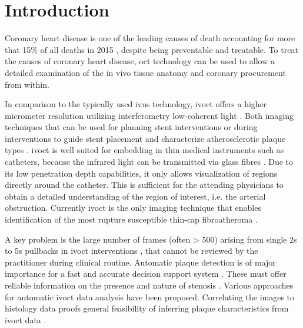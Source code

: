 \chapter{Introduction}

Coronary heart disease is one of the leading causes of death \cite{HannahRitchie.2018, NationalVitalStatisticsReports.2017} accounting for more that 15\% of all deaths in 2015 \cite{Kolluru.2018}, despite being preventable and treatable. To treat the causes of coronary heart disease, \acrfull{oct} technology can be used to allow a detailed examination of the in vivo tissue anatomy and coronary procurement from within.

In comparison to the typically used \acrfull{ivus} technology, \acrfull{ivoct} offers a higher micrometer resolution utilizing interferometry low-coherent light \cite{Schippling.2015, Drexler.2008}. Both imaging techniques that can be used for planning stent interventions or during interventions to guide stent placement and characterize atherosclerotic plaque types \cite{Kolluru.2018}. \Acrshort{ivoct} is well suited for embedding in thin medical instruments such as catheters, because the infrared light can be transmitted via glass fibres \cite{HiramG.Bezerra.2009, Gessert.2019}. Due to its low penetration depth capabilities, it only allows visualization of regions directly around the catheter. This is sufficient for the attending physicians to obtain a detailed understanding of the region of interest, i.e. the arterial obstruction. \cite{Gessert.2019} Currently \acrshort{ivoct} is the only imaging technique that enables identification of the most rupture susceptible thin-cap fibroatheroma \cite{GuhaRoy.2016}.

A key problem is the large number of frames (often > 500) arising from single 2s to 5s pullbacks in \acrshort{ivoct} interventions \cite{Kolluru.2018}, that cannot be reviewed by the practitioner during clinical routine. Automatic plaque detection is of major importance for a fast and accurate decision support system \cite{Gessert.2019}. These must offer reliable information on the presence and nature of stenosis \cite{Gessert.2019}. Various approaches for automatic \acrshort{ivoct} data analysis have been proposed. Correlating the images to histology data proofs general feasibility of inferring plaque characteristics from \acrshort{ivoct} data \cite{Yabushita.2002}.


